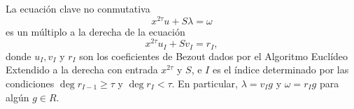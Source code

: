 \begin{theorem}
\label{th:mult_key_eq}
    La ecuación clave no conmutativa
    \begin{equation}
    \label{eq:key_equation}
        x^{2\tau}u + S\lambda = \omega
    \end{equation}
    es un múltiplo a la derecha de la ecuación
    \begin{equation}
    \label{eq:key_equation_div}
        x^{2\tau}u_{I} + Sv_{I} = r_{I},
    \end{equation}
    donde $u_{I}, v_{I}$ y $r_{I}$ son los coeficientes de Bezout dados por el Algoritmo Euclídeo Extendido a la derecha con entrada $x^{2\tau}$ y \(S\), e \(I\) es el índice determinado por las condiciones \(\deg r_{I-1} \ge \tau\) y \(\deg r_{I} < \tau\). En particular, \(\lambda = v_{I}g\) y \(\omega = r_{I}g\) para algún \(g \in R\).
\end{theorem}

